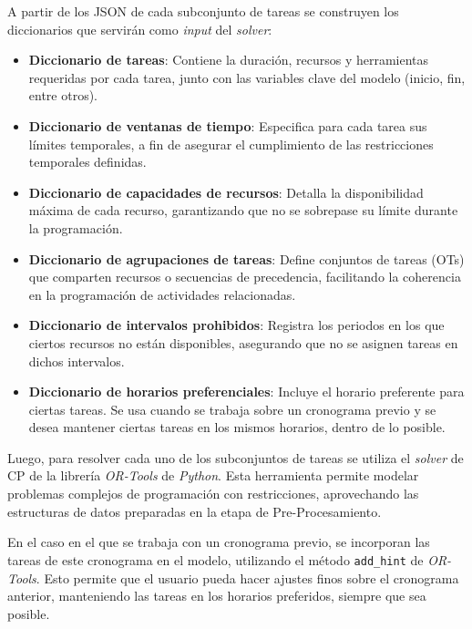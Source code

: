 \documentclass{article}
\begin{document}
A partir de los JSON de cada subconjunto de tareas se construyen los diccionarios que servirán como \textit{input} del \textit{solver}:

\begin{itemize}
    \item \textbf{Diccionario de tareas}: Contiene la duración, recursos y herramientas requeridas por cada tarea, junto con las variables clave del modelo (inicio, fin, entre otros).

    \item \textbf{Diccionario de ventanas de tiempo}: Especifica para cada tarea sus límites temporales, a fin de asegurar el cumplimiento de las restricciones temporales definidas.

    \item \textbf{Diccionario de capacidades de recursos}: Detalla la disponibilidad máxima de cada recurso, garantizando que no se sobrepase su límite durante la programación.

    \item \textbf{Diccionario de agrupaciones de tareas}: Define conjuntos de tareas (OTs) que comparten recursos o secuencias de precedencia, facilitando la coherencia en la programación de actividades relacionadas.

    \item \textbf{Diccionario de intervalos prohibidos}: Registra los periodos en los que ciertos recursos no están disponibles, asegurando que no se asignen tareas en dichos intervalos.

    \item \textbf{Diccionario de horarios preferenciales}: Incluye el horario preferente para ciertas tareas. Se usa cuando se trabaja sobre un cronograma previo y se desea mantener ciertas tareas en los mismos horarios, dentro de lo posible.

\end{itemize}



Luego, para resolver cada uno de los subconjuntos de tareas se utiliza el \textit{solver} de CP de la librería \textit{OR-Tools} de \textit{Python}. Esta herramienta permite modelar problemas complejos de programación con restricciones, aprovechando las estructuras de datos preparadas en la etapa de Pre-Procesamiento.

En el caso en el que se trabaja con un cronograma previo, se incorporan las tareas de este cronograma en el modelo, utilizando el método \verb|add_hint| de \textit{OR-Tools}. Esto permite que el usuario pueda hacer ajustes finos sobre el cronograma anterior, manteniendo las tareas en los horarios preferidos, siempre que sea posible.
\end{document}
